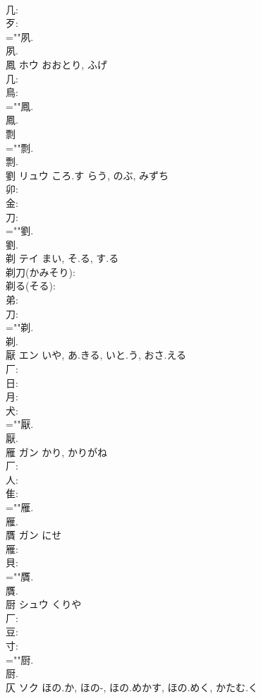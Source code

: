 \documentclass[8pt]{extreport}
\begin{document}
\begin{CJK}{UTF8}{min}
\\	几: 
\\	歹: 
\\	=""夙.
\\	夙.
\\	鳳	ホウ		おおとり, ふげ	
\\	几: 
\\	鳥: 
\\	=""鳳.
\\	鳳.
\\	剽						
\\	=""剽.
\\	剽.
\\	劉	リュウ	ころ.す	らう, のぶ, みずち	
\\	卯: 
\\	金: 
\\	刀: 
\\	=""劉.
\\	劉.
\\	剃	テイ	まい, そ.る, す.る		
\\	剃刀(かみそり): 
\\	剃る(そる): 
\\	弟: 
\\	刀: 
\\	=""剃.
\\	剃.
\\	厭	エン	いや, あ.きる, いと.う, おさ.える		
\\	厂: 
\\	日: 
\\	月: 
\\	犬: 
\\	=""厭.
\\	厭.
\\	雁	ガン	かり, かりがね		
\\	厂: 
\\	人: 
\\	隹: 
\\	=""雁.
\\	雁.
\\	贋	ガン	にせ		
\\	雁: 
\\	貝: 
\\	=""贋.
\\	贋.
\\	厨	シュウ	くりや		
\\	厂: 
\\	豆: 
\\	寸: 
\\	=""厨.
\\	厨.
\\	仄	ソク	ほの.か, ほの-, ほの.めかす, ほの.めく, かたむ.く		

\end{CJK}
\end{document}

